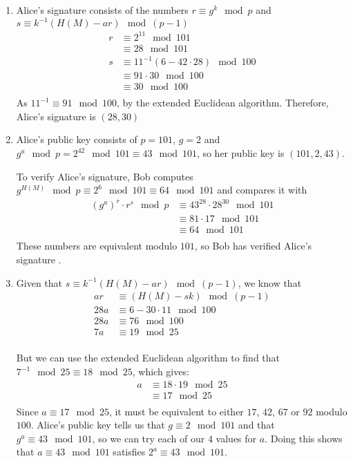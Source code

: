 \begin{enumerate}
\item Alice's signature consists of the numbers $r \equiv g^k\mod p$ and
  $s \equiv k^{-1}(H(M) - ar)\mod (p-1)$
  \begin{align*}
    r &\equiv 2^{11} \mod 101 \\
      &\equiv 28 \mod 101 \\
    s &\equiv 11^{-1}(6 - 42 \cdot 28)\mod 100 \\
      &\equiv 91 \cdot 30\mod 100 \\
      &\equiv 30 \mod 100\\
  \end{align*}
  As $11^{-1} \equiv 91\mod 100$, by the extended Euclidean algorithm. Therefore,
  Alice's signature is $(28, 30)$

\item Alice's public key consists of $p = 101$, $g = 2$ and $g^a \mod p = 2^{42}
\mod 101 \equiv 43 \mod 101$, so her public key is $(101, 2, 43)$.

  To verify Alice's signature, Bob computes $g^{H(M)} \mod p \equiv 2^6 \mod 101
  \equiv 64 \mod 101$ and compares it with
  \begin{align*}
    (g^a)^r \cdot r^s \mod p &\equiv 43^{28} \cdot 28^{30} \mod 101 \\
                             &\equiv 81 \cdot 17 \mod 101 \\
                             &\equiv 64 \mod 101\\
  \end{align*}
  These numbers are equivalent modulo $101$, so Bob has verified Alice's signature
  .

\item Given that $s \equiv k^{-1}(H(M) - ar)\mod (p-1)$, we know that
  \begin{align*}
    ar &\equiv (H(M) - sk) \mod (p-1) \\
    28a &\equiv 6 - 30 \cdot 11 \mod 100 \\
    28a &\equiv 76 \mod 100 \\
    7a &\equiv 19 \mod 25 \\
  \end{align*}

  But we can use the extended Euclidean algorithm to find that $7^{-1} \mod 25
  \equiv 18 \mod 25$, which gives:
  \begin{align*}
    a &\equiv 18 \cdot 19 \mod 25 \\
      &\equiv 17 \mod 25 \\
  \end{align*}
  Since $a \equiv 17 \mod 25$, it must be equivalent to either $17$, $42$, $67$ or
  $92$ modulo $100$. Alice's public key tells us that $g \equiv 2 \mod 101$ and
  that $g^a \equiv 43 \mod 101$, so we can try each of our $4$ values for $a$.
  Doing this shows that $a \equiv 43 \mod 101$ satisfies $2^a \equiv 43 \mod 101$.

\end{enumerate}
